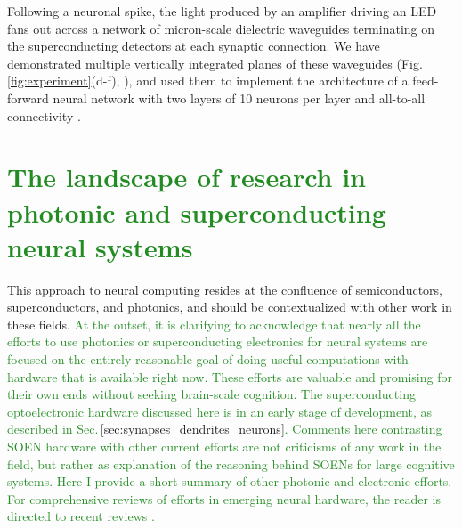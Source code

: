 \documentclass[twocolumn]{article}
\begin{document}
Following a neuronal spike, the light produced by an amplifier driving an LED fans out across a network of micron-scale dielectric waveguides terminating on the superconducting detectors at each synaptic connection. We have demonstrated multiple vertically integrated planes of these waveguides (Fig.\,\ref{fig:experiment}(d-f), \cite{chbu2017}), and used them to implement the architecture of a feed-forward neural network with two layers of 10 neurons per layer and all-to-all connectivity \cite{chbu2018}.

\section{\label{sec:other_approaches}\textcolor{ForestGreen}{The landscape of research in photonic and superconducting neural systems}}
This approach to neural computing resides at the confluence of semiconductors, superconductors, and photonics, and should be contextualized with other work in these fields. \textcolor{ForestGreen}{At the outset, it is clarifying to acknowledge that nearly all the efforts to use photonics or superconducting electronics for neural systems are focused on the entirely reasonable goal of doing useful computations with hardware that is available right now. These efforts are valuable and promising for their own ends without seeking brain-scale cognition. The superconducting optoelectronic hardware discussed here is in an early stage of development, as described in Sec.\,\ref{sec:synapses_dendrites_neurons}. Comments here contrasting SOEN hardware with other current efforts are not criticisms of any work in the field, but rather as explanation of the reasoning behind SOENs for large cognitive systems. Here I provide a short summary of other photonic and electronic efforts. For comprehensive reviews of efforts in emerging neural hardware, the reader is directed to recent reviews \cite{scpo2017,bexi2020,shta2021}.}
\end{document}
